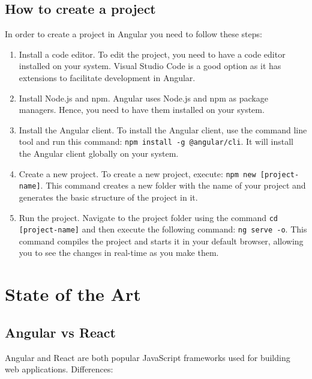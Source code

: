 \documentclass{article}
\begin{document}
  \subsection{How to create a project}
  In order to create a project in Angular you need to follow these steps:
  \begin{enumerate}
    \item Install a code editor. To edit the project, you need to have a code editor installed on your system. Visual Studio Code is a good option as it has extensions to facilitate development in Angular.
  \item Install Node.js and npm. Angular uses Node.js and npm as package managers. Hence, you need to have them installed on your system.
  \item Install the Angular client. To install the Angular client, use the command line tool and run this command: \verb|npm install -g @angular/cli|. It will install the Angular client globally on your system.
  \item Create a new project. To create a new project, execute: \verb|npm new [project-name]|. This command creates a new folder with the name of your project and generates the basic structure of the project in it.
  \item Run the project. Navigate to the project folder using the command \verb|cd [project-name]| and then execute the following command: \verb|ng serve -o|. This command compiles the project and starts it in your default browser, allowing you to see the changes in real-time as you make them.
  \end{enumerate}


  \section{State of the Art}
  \label{sec:state_of_the_art}

\subsection{Angular vs React}

Angular and React are both popular JavaScript frameworks used for building web applications. Differences:
\end{document}
